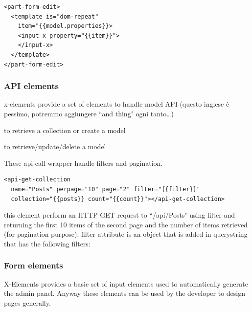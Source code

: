 \documentclass{sig-alternate}
\begin{document}
\begin{lstlisting}[language=HTML5, label={lst:add-a-label-here-n2}, captionpos=b,  caption=model edit form.]
<part-form-edit>
  <template is="dom-repeat" 
    item="{{model.properties}}>
    <input-x property="{{item}}">
    </input-x>
  </template>
</part-form-edit>
\end{lstlisting}







\subsubsection{API elements}
x-elements provide a set of elements to handle model API
(questo inglese è pessimo, potremmo aggiungere “and thing" ogni tanto…) 


\begin{description}
\itemsep1pt\parskip0pt
       \item[api-(get|post)-collection] to retrieve a collection or create a model
       \item[api-(get|put|delete)-model] to retrieve/update/delete a model
\end{description}




These api-call wrapper handle filters and pagination.


\begin{lstlisting}[language=HTML5, label={lst:add-a-label-here}, captionpos=b,  caption=Add a caption here.]
<api-get-collection 
  name="Posts" perpage="10" page="2" filter="{{filter}}"
  collection="{{posts}} count="{{count}}"></api-get-collection>
\end{lstlisting}


this element perform an HTTP GET request to “/api/Posts" using filter and returning the first 10 items of the second page and the number of items retrieved (for pagination purpose).
filter attribute is an object that is added in querystring
that has the following filters:











\subsubsection{Form elements}
X-Elements provides a basic set of input elements used to automatically generate the admin panel. Anyway these elements can be used by the developer to design pages generally.
\end{document}
